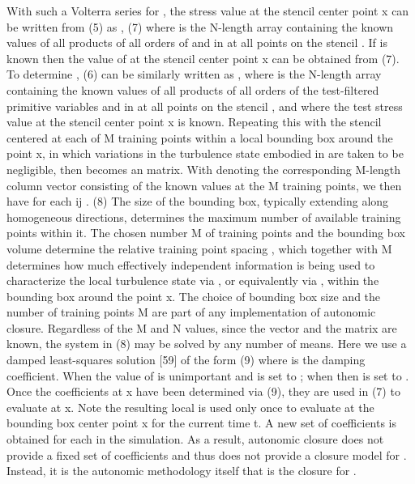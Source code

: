 With such a Volterra series for  , the stress value   at the stencil center point x can be written from (5) as
  ,                                                          (7)
where   is the N-length array containing the known values of all products of all orders of   and   in   at all points   on the stencil  . If   is known then the value of   at the stencil center point x can be obtained from (7). To determine  , (6) can be similarly written as  , where   is the N-length array containing the known values of all products of all orders of the test-filtered primitive variables   and   in   at all points   on the stencil  , and where the test stress value   at the stencil center point x is known. Repeating this with the stencil   centered at each of M training points within a local bounding box around the point x, in which variations in the turbulence state embodied in   are taken to be negligible, then   becomes an   matrix. With   denoting the corresponding M-length column vector consisting of the known   values at the M training points, we then have for each ij
  .                                                         (8)
The size of the bounding box, typically extending along homogeneous directions, determines the maximum number of available training points within it. The chosen number M of training points and the bounding box volume   determine the relative training point spacing  , which together with M determines how much effectively independent information is being used to characterize the local turbulence state via  , or equivalently via  , within the bounding box around the point x. The choice of bounding box size and the number of training points M are part of any implementation of autonomic closure. Regardless of the M and N values, since the vector   and the matrix   are known, the system in (8) may be solved by any number of means. Here we use a damped least-squares solution [59] of the form
                                                    (9)
where   is the damping coefficient. When   the value of   is unimportant and is set to  ; when   then   is set to  . Once the coefficients   at x have been determined via (9), they are used in (7) to evaluate   at x. 
Note the resulting local   is used only once to evaluate   at the bounding box center point x for the current time t. A new set of coefficients   is obtained for each   in the simulation. As a result, autonomic closure does not provide a fixed set of coefficients   and thus does not provide a closure model for  . Instead, it is the autonomic methodology itself that is the closure for  .


